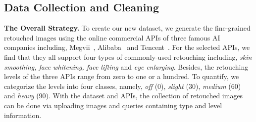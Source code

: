 \documentclass[sigconf]{acmart}
\begin{document}
\subsection{Data Collection and Cleaning}
\noindent\textbf{The Overall Strategy.}
To create our new dataset, we generate the fine-grained retouched images using the online commercial APIs of three famous AI companies including, Megvii~\cite{Megvii}, Alibaba~\cite{Alibaba} and Tencent~\cite{Tencent}.
For the selected APIs, we find that they all support four types of commonly-used retouching including, \textit{skin smoothing, face whitening, face lifting }and \textit{eye enlarging}.
Besides, the retouching levels of the three APIs range from zero to one or a hundred.
To quantify, we categorize the levels into four classes, namely, \textit{off} (0), \textit{slight} (30), \textit{medium} (60) and \textit{heavy} (90).
With the dataset and APIs, the collection of retouched images can be done via uploading images and queries containing type and level information.
\end{document}
